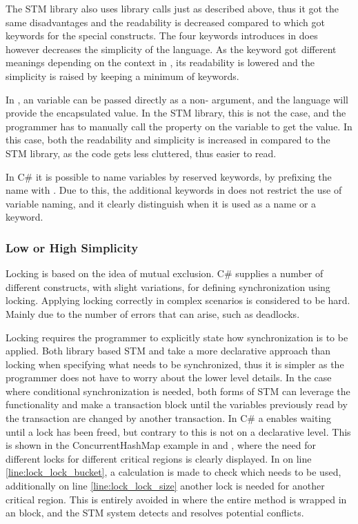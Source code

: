 The \ac{STM} library also uses library calls just as described above, thus it got the same disadvantages and the readability is decreased compared to \stmname which got keywords for the special constructs. The four keywords introduces in \stmname does however decreases the simplicity of the language. As the  keyword got different meanings depending on the context in \stmname, its readability is lowered and the simplicity is raised by keeping a minimum of keywords. 

In \stmname, an  variable can be passed directly as a non- argument, and the language will provide the encapsulated value. In the \ac{STM} library, this is not the case, and the programmer has to manually call the  property on the  variable to get the value. In this case, both the readability and simplicity is increased in \stmname compared to the \ac{STM} library, as the code gets less cluttered, thus easier to read.

In C\# it is possible to name variables by reserved keywords, by prefixing the name with . Due to this, the additional keywords in \stmname does not restrict the use of variable naming, and it clearly distinguish when it is used as a name or a keyword.

\subsubsection{Low or High Simplicity}\label{subsec:simplicity}
Locking is based on the idea of mutual exclusion. C\# supplies a number of different constructs, with slight variations, for defining synchronization using locking. Applying locking correctly in complex scenarios is considered to be hard\cite[p. 56]{sutter2005software}. Mainly due to the number of errors that can arise, such as deadlocks. 

Locking requires the programmer to explicitly state how synchronization is to be applied. Both library based \ac{STM} and \stmname take a more declarative approach than locking when specifying what needs to be synchronized, thus it is simpler as the programmer does not have to worry about the lower level details. In the case where conditional synchronization is needed, both forms of \ac{STM} can leverage the  functionality and make a transaction block until the variables previously read by the transaction are changed by another transaction. In C\# a  enables waiting until a lock has been freed, but contrary to  this is not on a declarative level. This is shown in the ConcurrentHashMap example in  and , where the need for different locks for different critical regions is clearly displayed. In  on line \ref{line:lock_lock_bucket}, a calculation is made to check which needs to be used, additionally on line \ref{line:lock_lock_size} another lock is needed for another critical region. This is entirely avoided in  where the entire method is wrapped in an  block, and the \ac{STM} system detects and resolves potential conflicts.

